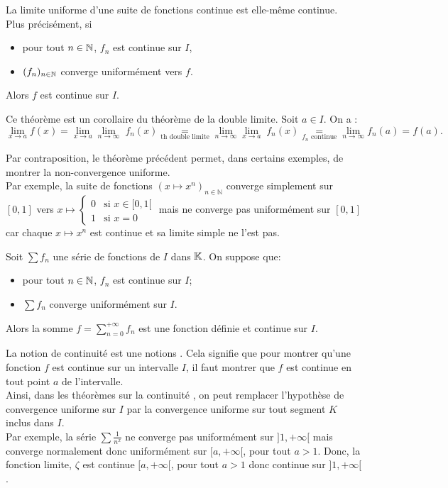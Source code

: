 \documentclass{book}
\newcommand{\fn}{(f_n)_{n\in \N   }}
\newcommand{\Sfn}{\sum f_n}
\begin{document}
\begin{Theoreme}
La limite uniforme d'une suite de fonctions continue est elle-même continue.\\
Plus précisément, si
\begin{itemize}
\item
  pour tout $n\in \mathbb{N}   $, $f_n$ est continue sur $I$,
\item
  $\fn$ converge uniformément vers $f$.
\end{itemize}
Alors $f$ est continue sur $I$.
\end{Theoreme}
\begin{Demonstration}
Ce théorème est un corollaire du théorème de la double limite. Soit $a\in I$. On a :
$$\lim_{x\to a} f(x)=\lim_{x\to a}\lim_{n\to\infty} \; f_n(x) \underset{\text{th double limite}}{=}\lim_{n\to\infty} \lim_{x\to a} \; f_n(x)\underset{f_n \text{ continue}}{=}\lim_{n\to\infty} f_n(a)= f(a).  $$
\end{Demonstration}
%
\begin{Remarque}
Par contraposition, le théorème précédent permet, dans certains exemples, de montrer la non-convergence uniforme. \\ 
Par exemple, la suite de fonctions $(x\mapsto x^n)_{n\in \mathbb{N}}$ converge simplement sur $[0,1]$ vers  $x \mapsto \begin{cases}0&{\text{si }}x\in[0,1[\\1&{\text{si } x=0}\end{cases}$ mais ne converge pas uniformément  sur $[0,1]$ car chaque $x\mapsto x^n$ est continue et sa limite simple ne l'est pas.
\end{Remarque}
\begin{Theoreme}
Soit $\Sfn$ une série de fonctions de $I$ dans $\mathbb{K}  $.
On suppose que:
\begin{itemize}
\item
  pour tout $n\in \mathbb{N}   $, $f_n$ est continue sur $I$;
\item
  $\Sfn$ converge uniformément sur $I$.
\end{itemize}
Alors la somme $f = \sum _{n=0}^{+\infty } f_n$ est une fonction définie et continue sur $I$.
\end{Theoreme}
\begin{Remarque}La notion de continuité est une notions . Cela signifie que pour montrer qu'une fonction $f$ est continue sur un intervalle $I$, il faut montrer que $f$ est continue en tout point $a$ de l'intervalle.\\
Ainsi, dans les théorèmes sur la continuité , on peut remplacer l'hypothèse de convergence uniforme sur $I$ par la convergence uniforme sur tout segment $K$ inclus dans $I$.\\
Par exemple, la série $\sum\frac {1}{n^{x}}$ ne converge pas uniformément sur $]1,+\infty[$ mais converge normalement donc uniformément sur  $[a,+\infty[$, pour tout $a>1$. Donc, la fonction limite,   $\zeta$ est continue $[a,+\infty[$, pour tout $a>1$ donc continue sur  $]1,+\infty[$.
\end{Remarque}
\end{document}
